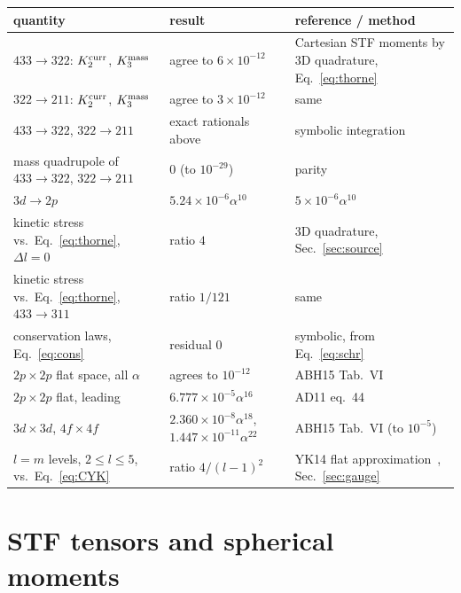 \documentclass[11pt]{article}
\begin{document}
\begin{center}
\small
\begin{tabular}{@{}>{\raggedright\arraybackslash}p{}>{\raggedright\arraybackslash}p{}>{\raggedright\arraybackslash}p{}@{}}
\toprule
quantity & result & reference / method\\
\midrule
$433\to322$: $K^{\rm curr}_2$, $K^{\rm mass}_3$ & agree to $6\times10^{-12}$ & Cartesian STF moments by 3D quadrature, Eq.~\eqref{eq:thorne}\\
$322\to211$: $K^{\rm curr}_2$, $K^{\rm mass}_3$ & agree to $3\times10^{-12}$ & same\\
$433\to322$, $322\to211$ & exact rationals above & symbolic integration\\
mass quadrupole of $433\to322$, $322\to211$ & $0$ (to $10^{-29}$) & parity\\
$3d\to2p$ & $5.24\times10^{-6}\alpha^{10}$ & $5\times10^{-6}\alpha^{10}$~\cite{BGLS21}\\
kinetic stress vs.\ Eq.~\eqref{eq:thorne}, $\Delta l=0$ & ratio $4$ & 3D quadrature, Sec.~\ref{sec:source}\\
kinetic stress vs.\ Eq.~\eqref{eq:thorne}, $433\to311$ & ratio $1/121$ & same\\
conservation laws, Eq.~\eqref{eq:cons} & residual $0$ & symbolic, from Eq.~\eqref{eq:schr}\\
$2p\times2p$ flat space, all $\alpha$ & agrees to $10^{-12}$ & ABH15 Tab.~VI~\cite{ABH15}\\
$2p\times2p$ flat, leading & $6.777\times10^{-5}\alpha^{16}$ & AD11 eq.~44~\cite{AD11}\\
$3d\times3d$, $4f\times4f$ & $2.360\times10^{-8}\alpha^{18}$, $1.447\times10^{-11}\alpha^{22}$ & ABH15 Tab.~VI (to $10^{-5}$)\\
$l=m$ levels, $2\le l\le5$, vs.\ Eq.~\eqref{eq:CYK} & ratio $4/(l-1)^2$ & YK14 flat approximation~\cite{YK14}, Sec.~\ref{sec:gauge}\\
\bottomrule
\end{tabular}
\end{center}

\appendix
\section{STF tensors and spherical moments}
\label{app:stf}
\end{document}
